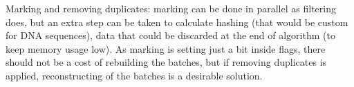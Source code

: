 \documentclass[a4paper,twoside]{article}
\begin{document}
Marking and removing duplicates: marking can be done in parallel as filtering does, but an extra step can be taken to calculate hashing (that would be custom for DNA sequences), data that could be discarded at the end of algorithm (to keep memory usage low). As marking is setting just a bit inside flags, there should not be a cost of rebuilding the batches, but if removing duplicates is applied, reconstructing of the batches is a desirable solution.

\end{document}
